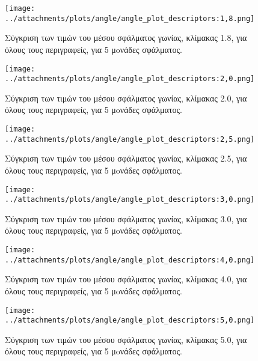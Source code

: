   
 \begin{figure}[ht!]
\begin{minipage}[b]{1.0\linewidth}
\centering
\texttt{[image: ../attachments/plots/angle/angle\_plot\_descriptors:1,8.png]}
\caption{Σύγκριση των τιμών του μέσου σφάλματος γωνίας, κλίμακας 1.8, για όλους τους περιγραφείς, για 5 μoνάδες σφάλματος.}
\label{fig:plot_scale_des_1.8_high}
\end{minipage}
 \end{figure} 
 \begin{figure}[ht!]
\begin{minipage}[b]{1.0\linewidth}
\centering
\texttt{[image: ../attachments/plots/angle/angle\_plot\_descriptors:2,0.png]}
\caption{Σύγκριση των τιμών του μέσου σφάλματος γωνίας, κλίμακας 2.0, για όλους τους περιγραφείς, για 5 μoνάδες σφάλματος.}
\label{fig:plot_scale_des_2.0_high}

\end{minipage}

 \end{figure} 
 
 \newpage
 
  
 \begin{figure}[ht!]
\begin{minipage}[b]{1.0\linewidth}
\centering
\texttt{[image: ../attachments/plots/angle/angle\_plot\_descriptors:2,5.png]}
\caption{Σύγκριση των τιμών του μέσου σφάλματος γωνίας, κλίμακας 2.5, για όλους τους περιγραφείς, για 5 μoνάδες σφάλματος.}
\label{fig:plot_scale_des_2.5_high}
\end{minipage}
 \end{figure} 
 \begin{figure}[ht!]
\begin{minipage}[b]{1.0\linewidth}
\centering
\texttt{[image: ../attachments/plots/angle/angle\_plot\_descriptors:3,0.png]}
\caption{Σύγκριση των τιμών του μέσου σφάλματος γωνίας, κλίμακας 3.0, για όλους τους περιγραφείς, για 5 μoνάδες σφάλματος.}
\label{fig:plot_scale_des_3.0_high}
\end{minipage} 
 \end{figure} 
 
\newpage

 \begin{figure}[ht!]
\begin{minipage}[b]{1.0\linewidth}
\centering
\texttt{[image: ../attachments/plots/angle/angle\_plot\_descriptors:4,0.png]}
\caption{Σύγκριση των τιμών του μέσου σφάλματος γωνίας, κλίμακας 4.0, για όλους τους περιγραφείς, για 5 μoνάδες σφάλματος.}
\label{fig:plot_scale_des_4.0_high}

\end{minipage}
 \end{figure} 
 \begin{figure}[ht!]
\begin{minipage}[b]{1.0\linewidth}
\centering
\texttt{[image: ../attachments/plots/angle/angle\_plot\_descriptors:5,0.png]}
\caption{Σύγκριση των τιμών του μέσου σφάλματος γωνίας, κλίμακας 5.0, για όλους τους περιγραφείς, για 5 μoνάδες σφάλματος.}
\label{fig:plot_scale_des_5.0_high}
\end{minipage}
 \end{figure} 
 
